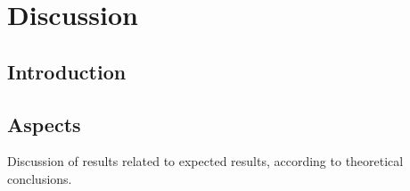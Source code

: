 \chapter{Discussion} \label{chap:Discussions}



\section{Introduction}

\section{Aspects}

Discussion of results related to expected results, according to theoretical conclusions.